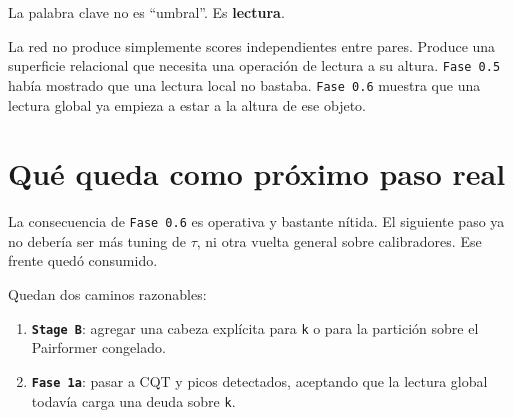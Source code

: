 \documentclass[11pt]{article}
\begin{document}
\begin{figure}[H]
\centering
{}
\end{figure}

La palabra clave no es ``umbral''. Es \textbf{lectura}.

La red no produce simplemente scores independientes entre pares. Produce una superficie relacional que necesita una operación de lectura a su altura. \texttt{Fase 0.5} había mostrado que una lectura local no bastaba. \texttt{Fase 0.6} muestra que una lectura global ya empieza a estar a la altura de ese objeto.

\section{Qué queda como próximo paso real}

La consecuencia de \texttt{Fase 0.6} es operativa y bastante nítida. El siguiente paso ya no debería ser más tuning de $\tau$, ni otra vuelta general sobre calibradores. Ese frente quedó consumido.

Quedan dos caminos razonables:

\begin{enumerate}
  \item \textbf{\texttt{Stage B}}: agregar una cabeza explícita para \texttt{k} o para la partición sobre el Pairformer congelado.
  \item \textbf{\texttt{Fase 1a}}: pasar a CQT y picos detectados, aceptando que la lectura global todavía carga una deuda sobre \texttt{k}.
\end{enumerate}
\end{document}
